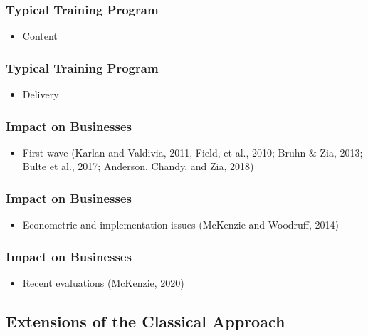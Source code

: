 \documentclass[hideothersubsections, usenames,dvipsnames,10pt]{beamer}
\begin{document}

\begin{frame}
\frametitle{Typical Training Program}
	\begin{itemize}
	\item Content %
	\vspace{0.1in}
	\end{itemize}
\end{frame}

\begin{frame}
\frametitle{Typical Training Program}
	\begin{itemize}
	\item Delivery %
	\vspace{0.1in}
	\end{itemize}
\end{frame}


\begin{frame}
\frametitle{Impact on Businesses}
	\begin{itemize}
	\item First wave (Karlan and Valdivia, 2011, Field, et al., 2010; Bruhn \& Zia, 2013; Bulte et al., 2017; Anderson, Chandy, and Zia, 2018)
	\vspace{0.1in}
	\end{itemize}
\end{frame}

\begin{frame}
\frametitle{Impact on Businesses}
	\begin{itemize}
	\item Econometric and implementation issues (McKenzie and Woodruff, 2014)
	\vspace{0.1in}
	\end{itemize}
\end{frame}

\begin{frame}
\frametitle{Impact on Businesses}
	\begin{itemize}
	\item Recent evaluations (McKenzie, 2020)
	\vspace{0.1in}
	\end{itemize}
\end{frame}


\subsection{Extensions of the Classical Approach}
\end{document}
